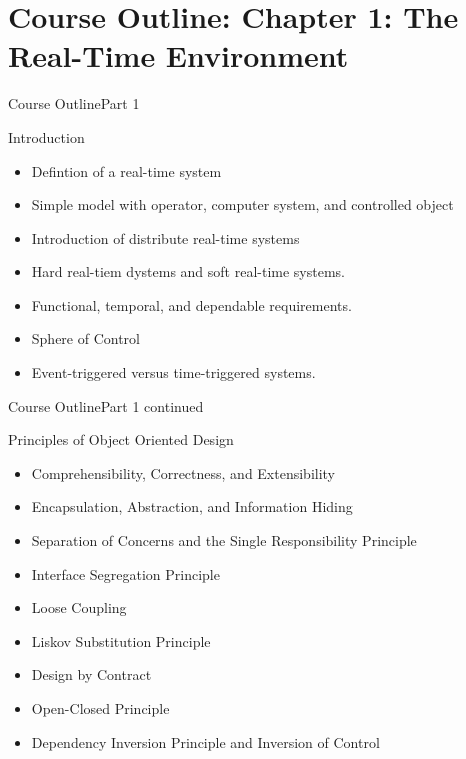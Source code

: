 \section{Course Outline: Chapter 1: The Real-Time Environment}

\begin{frame}{Course Outline}{Part 1}
    \begin{block}{Introduction}
		\begin{itemize}
		  \item Defintion of a real-time system
		  \item Simple model with operator, computer system, and controlled object
		  \item Introduction of distribute real-time systems
		  \item Hard real-tiem dystems and soft real-time systems.
		  \item Functional, temporal, and dependable requirements.
		  \item Sphere of Control
		  \item Event-triggered versus time-triggered systems.
		\end{itemize}
    \end{block}
\end{frame}

\begin{frame}{Course Outline}{Part 1 continued}
    \begin{block}{Principles of Object Oriented Design}
       \begin{itemize}
           \item Comprehensibility, Correctness, and Extensibility
           \item Encapsulation, Abstraction, and Information Hiding
           \item Separation of Concerns and the Single Responsibility Principle
           \item Interface Segregation Principle
           \item Loose Coupling 
           \item Liskov Substitution Principle
           \item Design by Contract
           \item Open-Closed Principle
           \item Dependency Inversion Principle and Inversion of Control
       \end{itemize}
    \end{block}
\end{frame}

